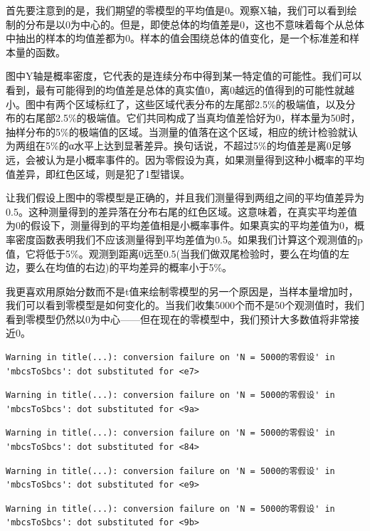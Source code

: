 \documentclass[
  letterpaper,
  DIV=11,
  numbers=noendperiod]{scrreprt}
\begin{document}
首先要注意到的是，我们期望的零模型的平均值是0。观察X轴，我们可以看到绘制的分布是以0为中心的。但是，即使总体的均值差是0，这也不意味着每个从总体中抽出的样本的均值差都为0。样本的值会围绕总体的值变化，是一个标准差和样本量的函数。

图中Y轴是概率密度，它代表的是连续分布中得到某一特定值的可能性。我们可以看到，最有可能得到的均值差是总体的真实值0，离0越远的值得到的可能性就越小。图中有两个区域标红了，这些区域代表分布的左尾部2.5\%的极端值，以及分布的右尾部2.5\%的极端值。它们共同构成了当真均值差恰好为0，样本量为50时，抽样分布的5\%的极端值的区域。当测量的值落在这个区域，相应的统计检验就认为两组在5\%的α水平上达到显著差异。换句话说，不超过5\%的均值差是离0足够远，会被认为是小概率事件的。因为零假设为真，如果测量得到这种小概率的平均值差异，即红色区域，则是犯了1型错误。

让我们假设上图中的零模型是正确的，并且我们测量得到两组之间的平均值差异为0.5。这种测量得到的差异落在分布右尾的红色区域。这意味着，在真实平均差值为0的假设下，测量得到的平均差值相是小概率事件。如果真实的平均差值为0，概率密度函数表明我们不应该测量得到平均差值为0.5。如果我们计算这个观测值的p值，它将低于5\%。观测到距离0远至0.5(当我们做双尾检验时，要么在均值的左边，要么在均值的右边)的平均差异的概率小于5\%。

我更喜欢用原始分数而不是t值来绘制零模型的另一个原因是，当样本量增加时，我们可以看到零模型是如何变化的。当我们收集5000个而不是50个观测值时，我们看到零模型仍然以0为中心------但在现在的零模型中，我们预计大多数值将非常接近0。

\begin{verbatim}
Warning in title(...): conversion failure on 'N = 5000的零假设' in
'mbcsToSbcs': dot substituted for <e7>
\end{verbatim}

\begin{verbatim}
Warning in title(...): conversion failure on 'N = 5000的零假设' in
'mbcsToSbcs': dot substituted for <9a>
\end{verbatim}

\begin{verbatim}
Warning in title(...): conversion failure on 'N = 5000的零假设' in
'mbcsToSbcs': dot substituted for <84>
\end{verbatim}

\begin{verbatim}
Warning in title(...): conversion failure on 'N = 5000的零假设' in
'mbcsToSbcs': dot substituted for <e9>
\end{verbatim}

\begin{verbatim}
Warning in title(...): conversion failure on 'N = 5000的零假设' in
'mbcsToSbcs': dot substituted for <9b>
\end{verbatim}
\end{document}
